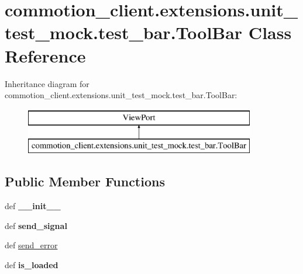\hypertarget{classcommotion__client_1_1extensions_1_1unit__test__mock_1_1test__bar_1_1ToolBar}{\section{commotion\+\_\+client.\+extensions.\+unit\+\_\+test\+\_\+mock.\+test\+\_\+bar.\+Tool\+Bar Class Reference}
\label{classcommotion__client_1_1extensions_1_1unit__test__mock_1_1test__bar_1_1ToolBar}
}
Inheritance diagram for commotion\+\_\+client.\+extensions.\+unit\+\_\+test\+\_\+mock.\+test\+\_\+bar.\+Tool\+Bar\+:\begin{figure}[H]
\begin{center}
\leavevmode
\includegraphics[height=2.000000cm]{classcommotion__client_1_1extensions_1_1unit__test__mock_1_1test__bar_1_1ToolBar}
\end{center}
\end{figure}
\subsection*{Public Member Functions}
\begin{DoxyCompactItemize}
\item 
\hypertarget{classcommotion__client_1_1extensions_1_1unit__test__mock_1_1test__bar_1_1ToolBar_a3b5b827110edea2c004ad18ac39c48c2}{def {\bfseries \+\_\+\+\_\+init\+\_\+\+\_\+}}\label{classcommotion__client_1_1extensions_1_1unit__test__mock_1_1test__bar_1_1ToolBar_a3b5b827110edea2c004ad18ac39c48c2}

\item 
\hypertarget{classcommotion__client_1_1extensions_1_1unit__test__mock_1_1test__bar_1_1ToolBar_a2590180f969a462b770cf5acadfdec89}{def {\bfseries send\+\_\+signal}}\label{classcommotion__client_1_1extensions_1_1unit__test__mock_1_1test__bar_1_1ToolBar_a2590180f969a462b770cf5acadfdec89}

\item 
def \hyperlink{classcommotion__client_1_1extensions_1_1unit__test__mock_1_1test__bar_1_1ToolBar_a88c0d36cbd949c0f9ded3423191b5af3}{send\+\_\+error}
\item 
\hypertarget{classcommotion__client_1_1extensions_1_1unit__test__mock_1_1test__bar_1_1ToolBar_a4c7d9655e04d923d46e5a8f4c230487d}{def {\bfseries is\+\_\+loaded}}\label{classcommotion__client_1_1extensions_1_1unit__test__mock_1_1test__bar_1_1ToolBar_a4c7d9655e04d923d46e5a8f4c230487d}

\end{DoxyCompactItemize}
